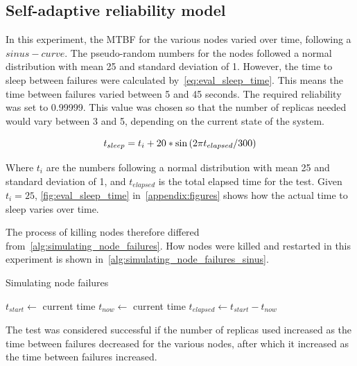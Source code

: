 \documentclass{cslthse-msc}
\begin{document}
\subsection{Self-adaptive reliability model} \label{sec:eval_adaptive_rel_model}
In this experiment, the MTBF for the various nodes varied over time, following a $sinus-curve$. The pseudo-random numbers for the nodes followed a normal distribution with mean 25 and standard deviation of 1. However, the time to sleep between failures were calculated by~\ref{eq:eval_sleep_time}. This means the time between failures varied between 5 and 45 seconds. The required reliability was set to 0.99999. This value was chosen so that the number of replicas needed would vary between 3 and 5, depending on the current state of the system.

\begin{equation} \label{eq:eval_sleep_time}
t_{sleep} = t_i + 20 * \sin{(2\*\pi\*t_{elapsed} / 300)}
\end{equation}

Where $t_i$ are the numbers following a normal distribution with mean 25 and standard deviation of 1, and $t_{elapsed}$ is the total elapsed time for the test. Given $t_i=25$, \cref{fig:eval_sleep_time} in~\cref{appendix:figures} shows how the actual time to sleep varies over time.

The process of killing nodes therefore differed from~\cref{alg:simulating_node_failures}. How nodes were killed and restarted in this experiment is shown in~\cref{alg:simulating_node_failures_sinus}.

\begin{algorithm} 
	\caption{Simulating node failures} \label{alg:simulating_node_failures_sinus}
	\begin{algorithmic}[1]
	\State $t_{start}\gets$ current time
		\State
		\State $t_{now}\gets$ current time
		\State $t_{elapsed}\gets t_{start}-t_{now}$
		\State
		\State
	\EndWhile
	\end{algorithmic}
\end{algorithm}

The test was considered successful if the number of replicas used increased as the time between failures decreased for the various nodes, after which it increased as the time between failures increased.
\end{document}
